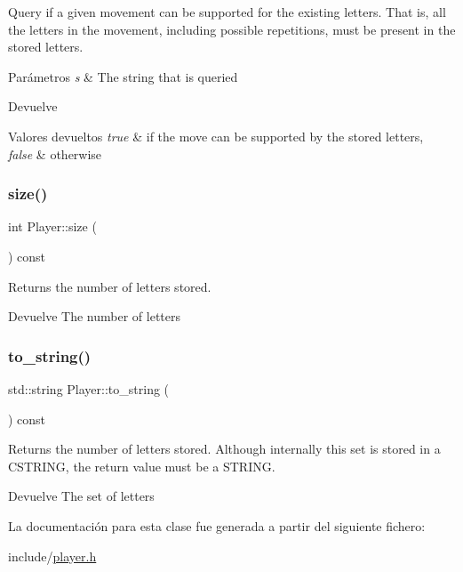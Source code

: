 Query if a given movement can be supported for the existing letters. That is, all the letters in the movement, including possible repetitions, must be present in the stored letters. 


\begin{DoxyParams}{Parámetros}
{\em s} & The string that is queried \\
\hline
\end{DoxyParams}
\begin{DoxyReturn}{Devuelve}

\end{DoxyReturn}

\begin{DoxyRetVals}{Valores devueltos}
{\em true} & if the move can be supported by the stored letters, \\
\hline
{\em false} & otherwise \\
\hline
\end{DoxyRetVals}
\mbox{\label{classPlayer_a706f8e7eb9f430881ce2c96e6f525b62}} 
\subsubsection{\texorpdfstring{size()}{size()}}
{\footnotesize\ttfamily int Player\+::size (\begin{DoxyParamCaption}{ }\end{DoxyParamCaption}) const}



Returns the number of letters stored. 

\begin{DoxyReturn}{Devuelve}
The number of letters 
\end{DoxyReturn}
\mbox{\label{classPlayer_a07c689d9000618e4d596ef47140f94fd}} 
\subsubsection{\texorpdfstring{to\+\_\+string()}{to\_string()}}
{\footnotesize\ttfamily std\+::string Player\+::to\+\_\+string (\begin{DoxyParamCaption}{ }\end{DoxyParamCaption}) const}



Returns the number of letters stored. Although internally this set is stored in a C\+S\+T\+R\+I\+NG, the return value must be a S\+T\+R\+I\+NG. 

\begin{DoxyReturn}{Devuelve}
The set of letters 
\end{DoxyReturn}


La documentación para esta clase fue generada a partir del siguiente fichero\+:\begin{DoxyCompactItemize}
\item 
include/\hyperlink{player_8h}{player.\+h}\end{DoxyCompactItemize}

